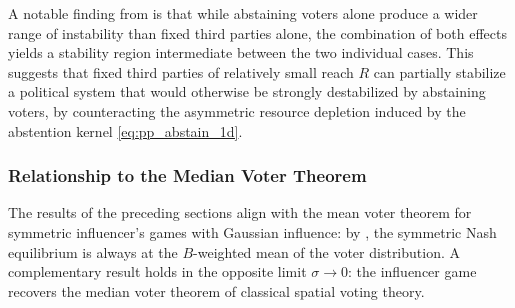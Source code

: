 \documentclass{article}
\begin{document}
        A notable finding from  is that while abstaining voters alone produce a wider range of instability than fixed third parties alone, the combination of both effects yields a stability region intermediate between the two individual cases.
        This suggests that fixed third parties of relatively small reach $R$ can partially stabilize a political system that would otherwise be strongly destabilized by abstaining voters, by counteracting the asymmetric resource depletion induced by the abstention kernel \cref{eq:pp_abstain_1d}.

    \subsubsection{Relationship to the Median Voter Theorem}\label{subsubsec:SI_median_voter}

        The results of the preceding sections align with the mean voter theorem for symmetric influencer's games with Gaussian influence: by , the symmetric Nash equilibrium is always at the $B$-weighted mean of the voter distribution.
        A complementary result holds in the opposite limit $\sigma \to 0$: the influencer game recovers the median voter theorem of classical spatial voting theory.
\end{document}
